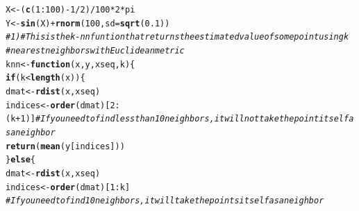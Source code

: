 \documentclass{article}\usepackage[]{graphicx}\usepackage[]{color}
\makeatletter
\newcommand{\hlnum}[1]{\textcolor[rgb]{0.686,0.059,0.569}{#1}}%
\newcommand{\hlcom}[1]{\textcolor[rgb]{0.678,0.584,0.686}{\textit{#1}}}%
\newcommand{\hlopt}[1]{\textcolor[rgb]{0,0,0}{#1}}%
\newcommand{\hlstd}[1]{\textcolor[rgb]{0.345,0.345,0.345}{#1}}%
\newcommand{\hlkwa}[1]{\textcolor[rgb]{0.161,0.373,0.58}{\textbf{#1}}}%
\newcommand{\hlkwb}[1]{\textcolor[rgb]{0.69,0.353,0.396}{#1}}%
\newcommand{\hlkwc}[1]{\textcolor[rgb]{0.333,0.667,0.333}{#1}}%
\newcommand{\hlkwd}[1]{\textcolor[rgb]{0.737,0.353,0.396}{\textbf{#1}}}%
\newenvironment{kframe}{%
 \def\at@end@of@kframe{}%
 \ifinner\ifhmode%
  \def\at@end@of@kframe{\end{minipage}}%
  \begin{minipage}{\columnwidth}%
 \fi\fi%
 \def\FrameCommand##1{\hskip\@totalleftmargin \hskip-\fboxsep
 \colorbox{shadecolor}{##1}\hskip-\fboxsep
     \hskip-\linewidth \hskip-\@totalleftmargin \hskip\columnwidth}%
 \MakeFramed {\advance\hsize-\width
   \@totalleftmargin\z@ \linewidth\hsize
   \@setminipage}}%
 {\par\unskip\endMakeFramed%
 \at@end@of@kframe}
\newenvironment{knitrout}{}{} %
\makeatother
\begin{document}
\begin{knitrout}
\begin{kframe}
{\ttfamily\noindent\itshape\color{messagecolor}{\#\# Loading required package: fields\\\#\# Loading required package: spam\\\#\# Loading required package: grid\\\#\# Spam version 0.40-0 (2013-09-11) is loaded.\\\#\# Type 'help( Spam)' or 'demo( spam)' for a short introduction \\\#\# and overview of this package.\\\#\# Help for individual functions is also obtained by adding the\\\#\# suffix '.spam' to the function name, e.g. 'help( chol.spam)'.\\\#\# \\\#\# Attaching package: 'spam'\\\#\# \\\#\# 下列对象被屏蔽了from 'package:base':\\\#\# \\\#\#\ \ \ \  backsolve, forwardsolve\\\#\# \\\#\# Loading required package: maps}}\begin{alltt}
\hlstd{X} \hlkwb{<-} \hlstd{(}\hlkwd{c}\hlstd{(}\hlnum{1}\hlopt{:}\hlnum{100}\hlstd{)} \hlopt{-} \hlnum{1}\hlopt{/}\hlnum{2}\hlstd{)}\hlopt{/}\hlnum{100} \hlopt{*} \hlnum{2} \hlopt{*} \hlstd{pi}
\hlstd{Y} \hlkwb{<-} \hlkwd{sin}\hlstd{(X)} \hlopt{+} \hlkwd{rnorm}\hlstd{(}\hlnum{100}\hlstd{,} \hlkwc{sd} \hlstd{=} \hlkwd{sqrt}\hlstd{(}\hlnum{0.1}\hlstd{))}
\hlcom{# 1) # This is the k-nn funtion that returns the estimated value of some point using k}
\hlcom{# nearest neighbors with Euclidean metric}
\hlstd{knn} \hlkwb{<-} \hlkwa{function}\hlstd{(}\hlkwc{x}\hlstd{,} \hlkwc{y}\hlstd{,} \hlkwc{xseq}\hlstd{,} \hlkwc{k}\hlstd{) \{}
    \hlkwa{if} \hlstd{(k} \hlopt{<} \hlkwd{length}\hlstd{(x)) \{}
        \hlstd{dmat} \hlkwb{<-} \hlkwd{rdist}\hlstd{(x, xseq)}
        \hlstd{indices} \hlkwb{<-} \hlkwd{order}\hlstd{(dmat)[}\hlnum{2}\hlopt{:}\hlstd{(k} \hlopt{+} \hlnum{1}\hlstd{)]}  \hlcom{# If you need to find less than 10 neighbors, it will not take the point itself as a neighbor}
        \hlkwd{return}\hlstd{(}\hlkwd{mean}\hlstd{(y[indices]))}
    \hlstd{\}} \hlkwa{else} \hlstd{\{}
        \hlstd{dmat} \hlkwb{<-} \hlkwd{rdist}\hlstd{(x, xseq)}
        \hlstd{indices} \hlkwb{<-} \hlkwd{order}\hlstd{(dmat)[}\hlnum{1}\hlopt{:}\hlstd{k]}
        \hlcom{# If you need to find 10 neighbors, it will take the points itself as a neighbor}

\end{alltt}
\end{kframe}
\end{knitrout}
\end{document}
